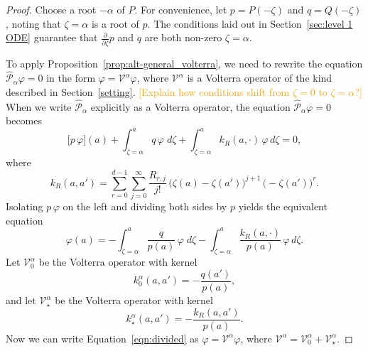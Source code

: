 \documentclass{article}
\theoremstyle{plain}
\newcommand{\volterra}{\mathcal{V}}
\newcommand{\hardpart}{\mathcal{V}_0}
\newcommand{\softpart}{\mathcal{V}_\star}
\newcommand{\hardker}{k_0}
\newcommand{\softker}{k_\star}
\begin{document}
\begin{proof}
Choose a root $-\alpha$ of $P$. For convenience, let $p = P(-\zeta)$ and $q = Q(-\zeta)$, noting that $\zeta = \alpha$ is a root of $p$. The conditions laid out in Section~\ref{sec:level 1 ODE} guarantee that $\frac{\partial}{\partial \zeta} p$ and $q$ are both non-zero $\zeta = \alpha$.

To apply Proposition~\ref{prop:alt-general_volterra}, we need to rewrite the equation $\hat{\mathcal{P}}_{\alpha}\varphi = 0$ in the form $\varphi = \volterra^\alpha \varphi$, where $\volterra^\alpha$ is a Volterra operator of the kind described in Section~\ref{setting}. \textcolor{orange}{[Explain how conditions shift from $\zeta = 0$ to $\zeta = \alpha$?]} When we write $\hat{\mathcal{P}}_\alpha$ explicitly as a Volterra operator, the equation $\hat{\mathcal{P}}_{\alpha} \varphi = 0$ becomes
\[ \big[ p\, \varphi \big](a) + \int_{\zeta=\alpha}^a q \, \varphi \; d\zeta + \int_{\zeta=\alpha}^a k_R(a,\cdot) \, \varphi \, d\zeta = 0, \]
where
\[ k_R(a,a')=\sum_{r=0}^{d-1}\sum_{j=0}^\infty \frac{R_{r,j}}{j!} \, \big(\zeta(a)-\zeta(a')\big)^{j+1} \, \big(-\zeta(a')\big)^r. \]
Isolating $p\,\varphi$ on the left and dividing both sides by $p$ yields the equivalent equation
\begin{equation}\label{eqn:divided}
\varphi(a) = -\int_{\zeta=\alpha}^a \frac{q}{p(a)} \, \varphi \; d\zeta - \int_{\zeta=\alpha}^a \frac{k_R(a,\cdot)}{p(a)} \, \varphi \, d\zeta.
\end{equation}
Let $\hardpart^\alpha$ be the Volterra operator with kernel
\[ \hardker^\alpha(a,a') = -\frac{q(a')}{p(a)}, \]
and let $\softpart^\alpha$ be the Volterra operator with kernel
\[ \softker^\alpha(a,a') = -\frac{k_R(a,a')}{p(a)}. \]
Now we can write Equation~\eqref{eqn:divided} as $\varphi = \volterra^\alpha \varphi$, where $\volterra^\alpha = \hardpart^\alpha + \softpart^\alpha$.


\end{proof}
\end{document}
